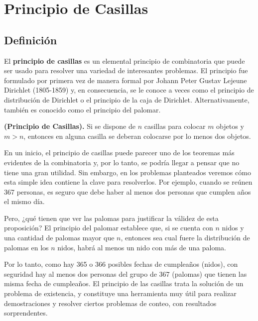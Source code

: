 \section{Principio de Casillas}

\subsection{Definición}

\begin{definicion}
    El \textbf{principio de casillas} es un elemental principio de combinatoria que puede  ser  usado  para  resolver  una  variedad  de  interesantes  problemas.  El  principio  fue  formulado  por  primera  vez  de  manera  formal por Johann Peter Gustav Lejeune Dirichlet (1805-1859) y, en consecuencia,  se  le conoce  a  veces  como  el  principio  de  distribución  de Dirichlet  o  el  principio  de  la  caja  de  Dirichlet. Alternativamente, también   es  conocido  como el principio  del palomar.
\end{definicion}

\begin{teorema}
    \textbf{(Principio de Casillas).} Si se dispone de $n$ casillas para colocar $m$ objetos y $m > n$, entonces en alguna casilla se deberan colocarse por lo menos dos objetos.
\end{teorema}

En un inicio, el principio de casillas puede parecer uno de los teoremas más evidentes de la combinatoria y, por lo tanto, se podría llegar a pensar que no tiene una gran utilidad. Sin embargo, en los problemas planteados veremos cómo esta simple idea contiene la clave para resolverlos. Por ejemplo, cuando se  reúnen 367 personas, es seguro que debe haber al menos dos personas que cumplen años el mismo día. 

Pero, ¿qué tienen que ver las palomas para justificar la  válidez de esta proposición? El principio del palomar establece que, si se cuenta con $n$ nidos y una cantidad de palomas mayor que $n$, entonces sea cual fuere la distribución de palomas en los $n$ nidos, habrá al menos un nido con más de una paloma.

Por lo tanto, como hay 365 o 366 posibles fechas de cumpleaños (nidos), con seguridad hay al menos dos personas del grupo de 367 (palomas) que tienen las misma fecha de cumpleaños. El principio de las casillas trata la solución de un problema de existencia, y constituye una herramienta muy útil para realizar demostraciones y resolver ciertos problemas de conteo, con resultados sorprendentes.

